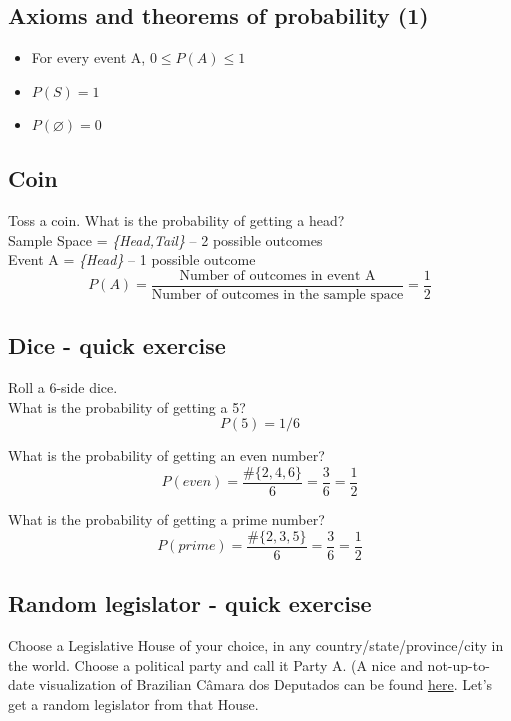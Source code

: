 \documentclass[11pt]{article}
\let\emptyset\varnothing
\begin{document}
	\subsection*{Axioms and theorems of probability (1)}
	\begin{itemize}
		\item For every event A, $0 \leq P(A) \leq 1$
		\item $P(S) = 1$
		\item $P(\emptyset) = 0$
	\end{itemize}


	\subsection*{Coin}
	Toss a coin. What is the probability of getting a head?\\
	
	Sample Space = \emph{\{Head,Tail\}} -- 2 possible outcomes\\
	
	Event A = \emph{\{Head\}} -- 1 possible outcome\\
	
	\[P(A) = \frac{\text{Number of outcomes in event A}}
	{\text{Number of outcomes in the sample space}} = \frac{1}{2}\]


	\subsection*{Dice - quick exercise}

	Roll a 6-side dice.\\
	
	What is the probability of getting a 5?\\
	\[P(5) = 1/6	\]
	
	What is the probability of getting an even number?\\
	\[P(even) = \frac{\#\{2, 4, 6\}}{6} = \frac{3}{6} = \frac{1}{2}	\]
		
	What is the probability of getting a prime number?\\
	\[P(prime) = \frac{\#\{2, 3, 5\}}{6} = \frac{3}{6} = \frac{1}{2}	\]

	\subsection*{Random legislator - quick exercise}

	Choose a Legislative House of your choice, in any country/state/province/city in the world. Choose a political party and call it Party A. (A nice and not-up-to-date visualization of Brazilian Câmara dos Deputados can be found \href{http://g1.globo.com/politica/eleicoes/2014/nova-composicao-da-camara.html}{here}. Let's get a random legislator from that House.\\
	
\end{document}
